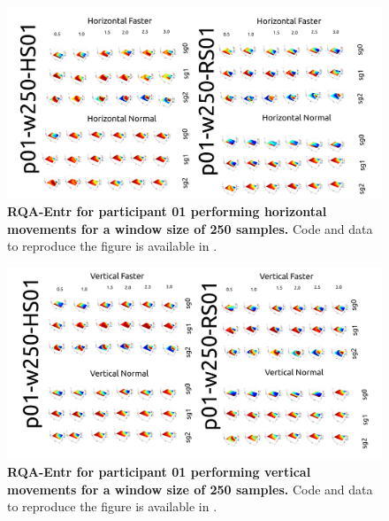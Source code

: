 \documentclass[12pt]{article}
\begin{document}
\newpage
\begin{figure}[ht!]
\centering
\includegraphics{figures/rqa/output/epsilons/rqa-epsilonsp01w250Horizontal}
    	\caption{
	{\bf RQA-Entr for participant 01 performing horizontal movements for a window size of 250 samples.}
	Code and data to reproduce the figure is available in \cite{srep2020}.
        }
    \label{fig-p01-H-w250}
\end{figure}
\begin{figure}[hb!]
\centering
\includegraphics{figures/rqa/output/epsilons/rqa-epsilonsp01w250Vertical}
    	\caption{
	{\bf RQA-Entr for participant 01 performing vertical movements for a window size of 250 samples.}
	Code and data to reproduce the figure is available in \cite{srep2020}.
        }
    \label{fig-p01-V-w250}
\end{figure}
\end{document}
